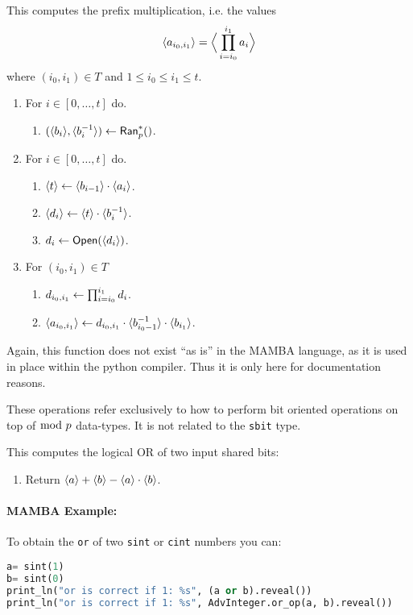 This computes the prefix multiplication, i.e. the values 
\[ \langle a_{i_0,i_1} \rangle = \Big\langle \prod_{i=i_0}^{i_1} a_i \Big\rangle \]
where $(i_0,i_1) \in T$ and $1 \le i_0 \le i_1 \le t$.
\begin{enumerate}
\item For $i \in [0,\ldots,t]$ do.
\begin{enumerate}
  \item $(\langle b_i \rangle,\langle b_i^{-1} \rangle) \leftarrow \mathsf{Ran}_p^*()$.
\end{enumerate}
\item For $i \in [0,\ldots,t]$ do.
\begin{enumerate}
  \item $\langle t \rangle \leftarrow \langle b_{i-1} \rangle \cdot \langle a_i \rangle$.
  \item $\langle d_i \rangle \leftarrow \langle t \rangle \cdot \langle b_i^{-1} \rangle$.
  \item $d_i \leftarrow {\mathsf{Open}}(\langle d_i \rangle)$.
\end{enumerate}
\item For $(i_0,i_1) \in T$ 
\begin{enumerate}
   \item $d_{i_0,i_1} \leftarrow \prod_{i=i_0}^{i_1} d_i$.
   \item $\langle a_{i_0,i_1} \rangle \leftarrow d_{i_0,i_1} \cdot
	   	\langle b_{i_0-1}^{-1} \rangle \cdot \langle b_{i_1} \rangle$.
\end{enumerate}
\end{enumerate}
Again, this function does not exist ``as is'' in the MAMBA language, as it
is used in place within the python compiler. Thus it is only here
for documentation reasons.



These operations refer exclusively to how to perform bit oriented operations on top of 
$\bmod \; p$ data-types. It is not related to the \verb|sbit| type.

This computes the logical OR of two input shared bits:
\begin{enumerate}
\item Return $\langle a \rangle+\langle b \rangle-\langle a \rangle \cdot \langle b \rangle$.
\end{enumerate}
\paragraph{MAMBA Example:} To obtain the \verb|or| of two \verb|sint| or \verb|cint| numbers you can: 
\begin{lstlisting}[language={python}]
a= sint(1)
b= sint(0)
print_ln("or is correct if 1: %s", (a or b).reveal())
print_ln("or is correct if 1: %s", AdvInteger.or_op(a, b).reveal())
\end{lstlisting}

